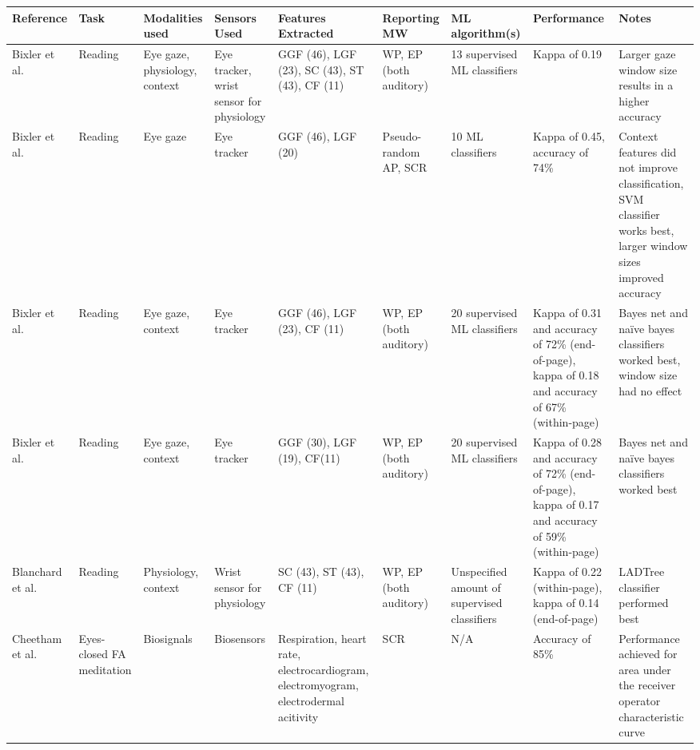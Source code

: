 \begin{xtabular}{p{25mm}p{30mm}p{30mm}p{33mm}p{22mm}p{22mm}p{33mm}p{27mm}p{35mm}}
  \toprule
        Reference & Task & Modalities used & Sensors Used & Features Extracted \footnotemark[1] & Reporting MW \footnotemark[2] & ML algorithm(s) & Performance & Notes\\
  \midrule
Bixler et al. \cite{Bixler2015AutomaticPhysiology} & Reading & Eye gaze, physiology, context & Eye tracker, wrist sensor for physiology & GGF (46), LGF (23), SC (43), ST (43), CF (11) & WP, EP (both auditory) & 13 supervised ML classifiers & Kappa of 0.19 & Larger gaze window size results in a higher accuracy \\
\midrule
Bixler et al. \cite{Bixler2015AutomaticAwareness} & Reading & Eye gaze & Eye tracker & GGF (46), LGF (20) & Pseudo-random AP, SCR & 10 ML classifiers & Kappa of 0.45, accuracy of 74\% & Context features did not improve classification, SVM classifier works best, larger window sizes improved accuracy\\
\midrule
Bixler et al. \cite{Bixler2016AutomaticReadingd} & Reading & Eye gaze, context & Eye tracker & GGF (46), LGF (23), CF (11) & WP, EP (both auditory) & 20 supervised ML classifiers & Kappa of 0.31 and accuracy of 72\% (end-of-page), kappa of 0.18 and accuracy of 67\% (within-page) & Bayes net and naïve bayes classifiers worked best, window size had no effect \\
\midrule
Bixler et al. \cite{Bixler2014TowardWanderingd} & Reading & Eye gaze, context & Eye tracker & GGF (30), LGF (19), CF(11) & WP, EP (both auditory) & 20 supervised ML classifiers & Kappa of 0.28 and accuracy of 72\% (end-of-page), kappa of 0.17 and accuracy of 59\% (within-page) & Bayes net and naïve bayes classifiers worked best \\
\midrule
Blanchard et al. \cite{Blanchard2014AutomatedLearning} & Reading & Physiology, context & Wrist sensor for physiology & SC (43), ST (43), CF (11) & WP, EP (both auditory) & Unspecified amount of supervised classifiers & Kappa of 0.22 (within-page), kappa of 0.14 (end-of-page) & LADTree classifier performed best \\
\midrule
Cheetham et al. \cite{Cheetham2016AutomatedApplication} & Eyes-closed FA meditation & Biosignals & Biosensors & Respiration, heart rate, electrocardiogram, electromyogram, electrodermal acitivity & SCR & N/A & Accuracy of 85\% & Performance achieved for area under the receiver operator characteristic curve\\
\midrule

\end{xtabular}
